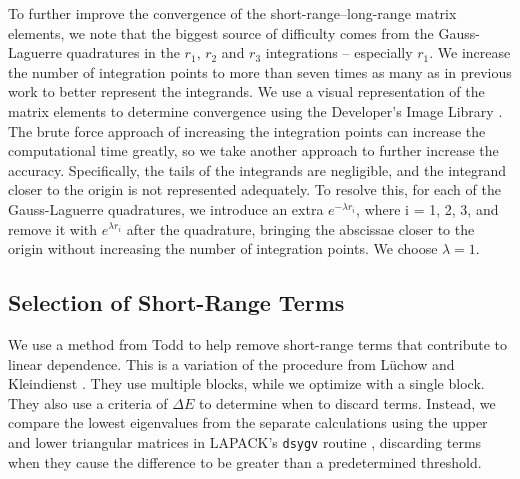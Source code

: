 \documentclass[preprint,showpacs,showkeys,preprintnumbers,amsmath,amssymb,longbibliography,pra,aps]{revtex4-1}
\begin{document}
{To further improve the convergence of the short-range--long-range matrix 
elements, we note that the biggest source of difficulty
comes from the Gauss-Laguerre quadratures in the $r_1$, $r_2$ and $r_3$ 
integrations -- especially $r_1$. We increase the number of integration 
points to more than seven times as many as in previous work
\cite{VanReeth2003,VanReeth2004} to better represent the integrands. We use
a visual representation of the matrix elements to determine convergence using
the Developer's Image Library \cite{DevIL}. The brute force approach
of increasing the integration points
can increase the computational time greatly, so we take another approach to 
further increase the accuracy. Specifically, the tails of the integrands are 
negligible, and the integrand closer to the origin is not represented 
adequately. To resolve this, for each of the Gauss-Laguerre quadratures, we 
introduce an extra $e^{-\lambda r_i}$, where i = 1, 2, 3,
and remove it with $e^{\lambda r_i}$ 
after the quadrature, bringing the abscissae closer to the origin without 
increasing the number of integration points. We choose $\lambda = 1$.

\subsection{Selection of Short-Range Terms}
\label{sec:Truncation}
We use a method from Todd \cite{Todd2007} to help remove short-range terms that
contribute to linear dependence. This is a variation of the procedure from
L\"uchow and Kleindienst \cite{Luchow1992}. They use multiple blocks, while we 
optimize with a single block. They also use a criteria of $\Delta E$ to 
determine when to discard terms. Instead, we compare the lowest eigenvalues 
from the separate calculations using the upper and lower triangular matrices 
in LAPACK's \texttt{dsygv} routine \cite{LAPACK}, discarding terms when they 
cause the difference to be greater than a predetermined threshold.

}
\end{document}
